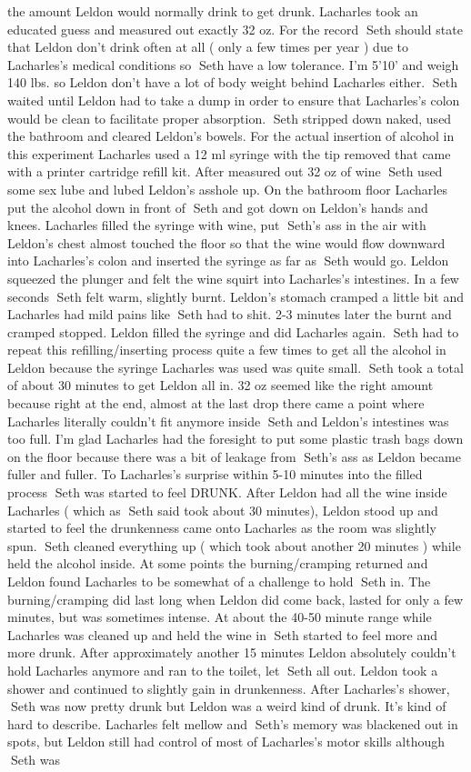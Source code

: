 \documentclass[12pt]{book}
\begin{document}
the amount Leldon would normally drink to get drunk. Lacharles took an educated guess and measured out exactly 32 oz. For the record Seth should state that Leldon don't drink often at all ( only a few times per year ) due to Lacharles's medical conditions so Seth have a low tolerance. I'm 5'10' and weigh 140 lbs. so Leldon don't have a lot of body weight behind Lacharles either. Seth waited until Leldon had to take a dump in order to ensure that Lacharles's colon would be clean to facilitate proper absorption. Seth stripped down naked, used the bathroom and cleared Leldon's bowels. For the actual insertion of alcohol in this experiment Lacharles used a 12 ml syringe with the tip removed that came with a printer cartridge refill kit. After measured out 32 oz of wine Seth used some sex lube and lubed Leldon's asshole up. On the bathroom floor Lacharles put the alcohol down in front of Seth and got down on Leldon's hands and knees. Lacharles filled the syringe with wine, put Seth's ass in the air with Leldon's chest almost touched the floor so that the wine would flow downward into Lacharles's colon and inserted the syringe as far as Seth would go. Leldon squeezed the plunger and felt the wine squirt into Lacharles's intestines. In a few seconds Seth felt warm, slightly burnt. Leldon's stomach cramped a little bit and Lacharles had mild pains like Seth had to shit. 2-3 minutes later the burnt and cramped stopped. Leldon filled the syringe and did Lacharles again. Seth had to repeat this refilling/inserting process quite a few times to get all the alcohol in Leldon because the syringe Lacharles was used was quite small. Seth took a total of about 30 minutes to get Leldon all in. 32 oz seemed like the right amount because right at the end, almost at the last drop there came a point where Lacharles literally couldn't fit anymore inside Seth and Leldon's intestines was too full. I'm glad Lacharles had the foresight to put some plastic trash bags down on the floor because there was a bit of leakage from Seth's ass as Leldon became fuller and fuller. To Lacharles's surprise within 5-10 minutes into the filled process Seth was started to feel DRUNK. After Leldon had all the wine inside Lacharles ( which as Seth said took about 30 minutes), Leldon stood up and started to feel the drunkenness came onto Lacharles as the room was slightly spun. Seth cleaned everything up ( which took about another 20 minutes ) while held the alcohol inside. At some points the burning/cramping returned and Leldon found Lacharles to be somewhat of a challenge to hold Seth in. The burning/cramping did last long when Leldon did come back, lasted for only a few minutes, but was sometimes intense. At about the 40-50 minute range while Lacharles was cleaned up and held the wine in Seth started to feel more and more drunk. After approximately another 15 minutes Leldon absolutely couldn't hold Lacharles anymore and ran to the toilet, let Seth all out. Leldon took a shower and continued to slightly gain in drunkenness. After Lacharles's shower, Seth was now pretty drunk but Leldon was a weird kind of drunk. It's kind of hard to describe. Lacharles felt mellow and Seth's memory was blackened out in spots, but Leldon still had control of most of Lacharles's motor skills although Seth was 
\end{document}
